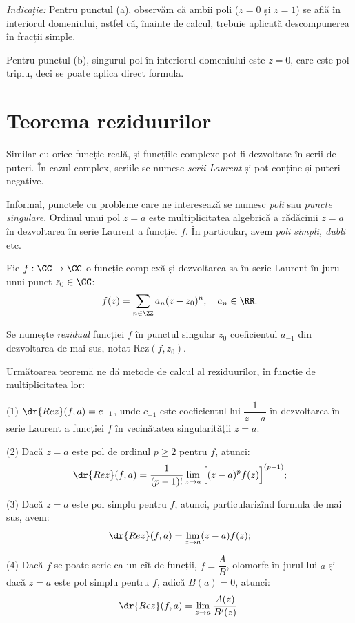 \emph{Indicație:} Pentru punctul (a), observăm că ambii poli ($z = 0 $ și $ z = 1 $)
se află în interiorul domeniului, astfel că, înainte de calcul, trebuie aplicată
descompunerea în fracții simple.

Pentru punctul (b), singurul pol în interiorul domeniului este $ z = 0 $, care este
pol triplu, deci se poate aplica direct formula.




\section{Teorema reziduurilor}

Similar cu orice funcție reală, și funcțiile complexe pot fi dezvoltate în serii
de puteri. În cazul complex, seriile se numesc \emph{serii Laurent} și pot conține
și puteri negative.

Informal, punctele cu probleme care ne interesează se numesc \emph{poli}
sau \emph{puncte singulare}. Ordinul unui pol $ z = a $ este multiplicitatea algebrică
a rădăcinii $ z = a $ în dezvoltarea în serie Laurent a funcției $ f $. În particular,
avem \emph{poli simpli, dubli} etc.

\begin{definition}\label{def:rez}
  Fie $ f : \CC \to \CC $ o funcție complexă și dezvoltarea sa în serie Laurent
  în jurul unui punct $ z_0 \in \CC $:
  \[
    f(z) = \sum_{n \in \ZZ} a_n (z - z_0)^n, \quad a_n \in \RR.
  \]

  Se numește \emph{reziduul} funcției $ f $ în punctul singular $ z_0 $ coeficientul
  $ a_{-1} $ din dezvoltarea de mai sus, notat $ \mathrm{Rez}(f, z_0) $.
\end{definition}

Următoarea teoremă ne dă metode de calcul al reziduurilor, în funcție de multiplicitatea
lor:

\begin{theorem}\label{thm:calc-rez}
  (1) $ \dr{Rez}(f, a) = c_{-1} $, unde $ c_{-1} $ este coeficientul lui $ \dfrac{1}{z-a} $
  în dezvoltarea în serie Laurent a funcției $ f $ în vecinătatea singularității $ z = a $.

  (2) Dacă $ z = a $ este pol de ordinul $ p \geq 2 $ pentru $ f $, atunci:
  \[
    \dr{Rez}(f, a) = \dfrac{1}{(p-1)!} \lim_{z \to a} \Big[ (z - a)^p f(z) \Big]^{(p-1)};
  \]

  (3) Dacă $ z = a $ este pol simplu pentru $ f $, atunci, particularizînd formula
  de mai sus, avem:
  \[
    \dr{Rez}(f, a) = \lim_{z \to a} (z - a) f(z);
  \]

  (4) Dacă $ f $ se poate scrie ca un cît de funcții, $ f = \dfrac{A}{B} $, olomorfe în
  jurul lui $ a $ și dacă $ z = a $ este pol simplu pentru $ f $, adică $ B(a) = 0 $,
  atunci:
  \[
    \dr{Rez}(f, a) = \lim_{z \to a} \dfrac{A(z)}{B'(z)}.
  \]
\end{theorem}

